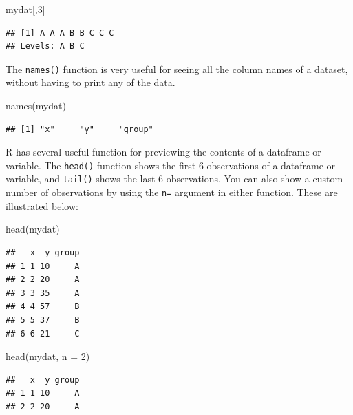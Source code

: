 \documentclass[
]{article}
\newenvironment{Shaded}{\begin{snugshade}}{\end{snugshade}}
\newcommand{\AttributeTok}[1]{\textcolor[rgb]{0.77,0.63,0.00}{#1}}
\newcommand{\DecValTok}[1]{\textcolor[rgb]{0.00,0.00,0.81}{#1}}
\newcommand{\FunctionTok}[1]{\textcolor[rgb]{0.00,0.00,0.00}{#1}}
\newcommand{\NormalTok}[1]{#1}
\begin{document}
\begin{Shaded}
\begin{Highlighting}[]
\NormalTok{mydat[,}\DecValTok{3}\NormalTok{]}
\end{Highlighting}
\end{Shaded}

\begin{verbatim}
## [1] A A A B B C C C
## Levels: A B C
\end{verbatim}

The \texttt{names()} function is very useful for seeing all the column names of
a dataset, without having to print any of the data.

\begin{Shaded}
\begin{Highlighting}[]
\FunctionTok{names}\NormalTok{(mydat)}
\end{Highlighting}
\end{Shaded}

\begin{verbatim}
## [1] "x"     "y"     "group"
\end{verbatim}

R has several useful function for previewing the contents of a dataframe
or variable. The \texttt{head()} function shows the first 6 observations of a
dataframe or variable, and \texttt{tail()} shows the last 6 observations. You
can also show a custom number of observations by using the \texttt{n=} argument
in either function. These are illustrated below:

\begin{Shaded}
\begin{Highlighting}[]
\FunctionTok{head}\NormalTok{(mydat)}
\end{Highlighting}
\end{Shaded}

\begin{verbatim}
##   x  y group
## 1 1 10     A
## 2 2 20     A
## 3 3 35     A
## 4 4 57     B
## 5 5 37     B
## 6 6 21     C
\end{verbatim}

\begin{Shaded}
\begin{Highlighting}[]
\FunctionTok{head}\NormalTok{(mydat, }\AttributeTok{n =} \DecValTok{2}\NormalTok{)}
\end{Highlighting}
\end{Shaded}

\begin{verbatim}
##   x  y group
## 1 1 10     A
## 2 2 20     A
\end{verbatim}
\end{document}
